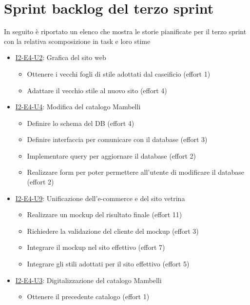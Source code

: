 \chapter{Sprint backlog del terzo sprint}
\label{app:sprint-backlog}

In seguito è riportato un elenco che mostra le storie pianificate per il terzo sprint con la relativa scomposizione in task e loro stime

\begin{itemize}
  \item \hyperref[user-story:i2-e4-u2]{I2-E4-U2}: Grafica del sito web
        \begin{itemize}
          \item Ottenere i vecchi fogli di stile adottati dal caseificio (effort 1)
          \item Adattare il vecchio stile al nuovo sito (effort 4)
        \end{itemize}
  \item \hyperref[user-story:i2-e4-u4]{I2-E4-U4}: Modifica del catalogo Mambelli
        \begin{itemize}
          \item Definire lo schema del DB (effort 4)
          \item Definire interfaccia per comunicare con il database (effort 3)
          \item Implementare query per aggiornare il database (effort 2)
          \item Realizzare form per poter permettere all'utente di modificare il database (effort 2)
        \end{itemize}
  \item \hyperref[user-story:i2-e4-u9]{I2-E4-U9}: Unificazione dell'e-commerce e del sito vetrina
        \begin{itemize}
          \item Realizzare un mockup del risultato finale (effort 11)
          \item Richiedere la validazione del cliente del mockup (effort 3)
          \item Integrare il mockup nel sito effettivo (effort 7)
          \item Integrare gli stili adottati per il sito effettivo (effort 5)
        \end{itemize}
  \item \hyperref[user-story:i2-e4-u3]{I2-E4-U3}: Digitalizzazione del catalogo Mambelli
        \begin{itemize}
          \item Ottenere il precedente catalogo (effort 1)

\end{itemize}
\end{itemize}
